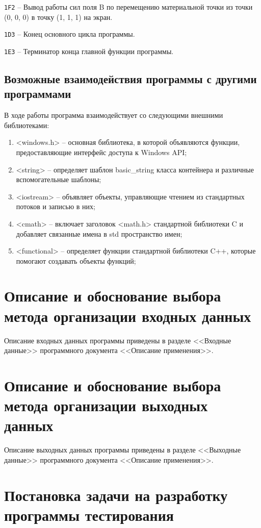 \documentclass[14pt,a4paper,final]{extreport}
\begin{document}
\texttt{1F2} -- Вывод работы сил поля B по перемещению материальной точки из точки (0, 0, 0) в точку (1, 1, 1) на экран.

\texttt{1D3} -- Конец основного цикла программы.

\texttt{1E3} -- Терминатор конца главной функции программы.

\pagebreak

\subsection{Возможные взаимодействия программы с другими программами}

В ходе работы программа взаимодействует со следующими внешними библиотеками:
\begin{enumerate}[itemindent=\parindent]
\item <windows.h> -- основная библиотека, в которой объявляются функции, предоставляющие интерфейс доступа к Windows API;
	\item <string> -- определяет шаблон basic\_string класса контейнера и различные вспомогательные шаблоны;
	\item <iostream> -- объявляет объекты, управляющие чтением из стандартных потоков и записью в них;
	\item <cmath> -- включает заголовок <math.h> стандартной библиотеки C и добавляет связанные имена в std пространство имен;
	\item <functional> -- определяет функции стандартной библиотеки C++, которые помогают создавать объекты функций;
\end{enumerate}

\section{Описание и обоснование выбора метода организации входных данных}

Описание входных данных программы приведены в разделе <<Входные данные>> программного документа <<Описание применения>>.

\section{Описание и обоснование выбора метода организации выходных данных}

Описание выходных данных программы приведены в разделе <<Выходные данные>> программного документа <<Описание применения>>.

\section{Постановка задачи на разработку программы тестирования}
\end{document}
